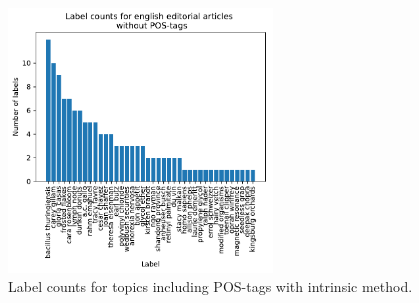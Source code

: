 {\begin{figure}[h]
\begin{minipage}[t]{0.5\textwidth}
	\end{minipage}%
	\begin{minipage}[t]{0.5\textwidth}
		\includegraphics[width=7cm]{gfx/POS-gen1/ohne_POS.pdf}
	\end{minipage}%
	\caption{Label counts for topics including \ac{POS}-tags with intrinsic method.}
	\label{fig:labelcount_intrinsic_pos}
\end{figure}

}
